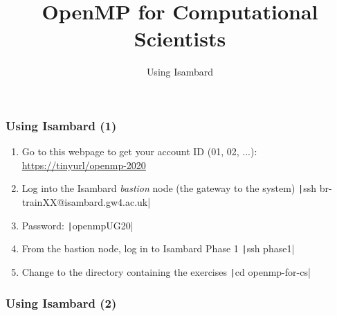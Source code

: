 \documentclass[aspectratio=169]{beamer}
\title{OpenMP for Computational Scientists}
\subtitle{Using Isambard}
\begin{document}
\frame{\titlepage}


\begin{frame}
\frametitle{Using Isambard (1)}
\begin{enumerate}
\item Go to this webpage to get your account ID (01, 02, ...): \url{https://tinyurl/openmp-2020}
\item Log into the Isambard \emph{bastion} node (the gateway to the system)\newline
\texttt|ssh br-trainXX@isambard.gw4.ac.uk|
\item Password: \texttt|openmpUG20|
\item From the bastion node, log in to Isambard Phase 1\newline
\texttt|ssh phase1|
\item Change to the directory containing the exercises\newline
\texttt|cd openmp-for-cs|
\end{enumerate}

\end{frame}

\begin{frame}
\frametitle{Using Isambard (2)}

\end{frame}
\end{document}
